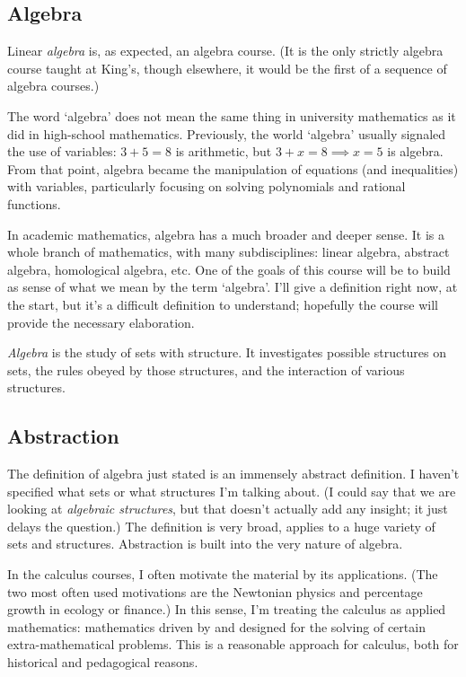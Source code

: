 \documentclass[fleqn]{report}
\begin{document}
\subsection{Algebra}

Linear \emph{algebra} is, as expected, an algebra course. (It
is the only strictly algebra course taught at King's, though
elsewhere, it would be the first of a sequence of algebra
courses.)

The word `algebra' does not mean the same thing in university
mathematics as it did in high-school mathematics. Previously,
the world `algebra' usually signaled the use of variables:
$3+5 = 8$ is arithmetic, but $3 + x = 8 \implies x = 5$ is
algebra. From that point, algebra became the manipulation of
equations (and inequalities) with variables, particularly
focusing on solving polynomials and rational functions.

In academic mathematics, algebra has a much broader and deeper
sense. It is a whole branch of mathematics, with many
subdisciplines: linear algebra, abstract algebra, homological
algebra, etc. One of the goals of this course will be to build
as sense of what we mean by the term `algebra'. I'll give a
definition right now, at the start, but it's a difficult
definition to understand; hopefully the course will provide
the necessary elaboration.

\begin{defn}
\emph{Algebra} is the study of sets with structure. It
investigates possible structures on sets, the rules obeyed by
those structures, and the interaction of various structures. 
\end{defn}

\subsection{Abstraction}
\label{abstraction}

The definition of algebra just stated is an immensely
abstract definition. I haven't specified what sets or what
structures I'm talking about. (I could say that we are looking
at \emph{algebraic structures}, but that doesn't actually add
any insight; it just delays the question.) The definition is
very broad, applies to a huge variety of sets and structures.
Abstraction is built into the very nature of algebra. 

In the calculus courses, I often motivate the material by its
applications. (The two most often used motivations are the
Newtonian physics and percentage growth in ecology or
finance.) In this sense, I'm treating the calculus as applied
mathematics: mathematics driven by and designed for the
solving of certain extra-mathematical problems. This is a
reasonable approach for calculus, both for historical and
pedagogical reasons. 
\end{document}
